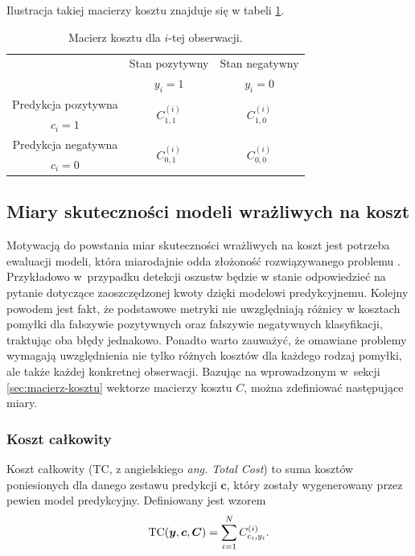 \documentclass[inzynierska]{pwr_wmat_praca_dyplomowa}
\theoremstyle{plain}
\numberwithin{theorem}{chapter}
\theoremstyle{definition}
\numberwithin{theorem}{chapter}
\begin{document}
Ilustracja takiej macierzy kosztu znajduje się w tabeli \ref{tab:macierz-kosztu}.
\begin{table}[h]
	\begin{center}
		\begin{tabular}{c|c|c}
			\multirow{2}{4em}{} & Stan pozytywny & Stan negatywny \\
			& $y_i = 1$            & $y_i = 0$ \\
			\hline
			Predykcja pozytywna & \multirow{2}{4em}{\centering $C^{(i)}_{1,1}$} & \multirow{2}{4em}{\centering $C^{(i)}_{1,0}$} \\
			$c_i = 1$         &                    &                    \\
			\hline
			Predykcja negatywna & \multirow{2}{4em}{\centering $C^{(i)}_{0,1}$} & \multirow{2}{4em}{\centering $C^{(i)}_{0,0}$} \\
			$c_i = 0$         &                    &                    \\
		\end{tabular}
	\end{center}
	\caption{Macierz kosztu dla $i$-tej obserwacji.}
	\label{tab:macierz-kosztu}
\end{table}

\subsection{Miary skuteczności modeli wrażliwych na koszt}
Motywacją do powstania miar skuteczności wrażliwych na koszt jest potrzeba ewaluacji modeli, która miarodajnie odda złożoność rozwiązywanego problemu \cite{EDCSLR}. Przykładowo w~przypadku detekcji oszustw będzie w stanie odpowiedzieć na pytanie dotyczące zaoszczędzonej kwoty dzięki modelowi predykcyjnemu. Kolejny powodem jest fakt, że podstawowe metryki nie uwzględniają różnicy w kosztach pomyłki dla fałszywie pozytywnych oraz fałszywie negatywnych klasyfikacji, traktując oba błędy jednakowo. Ponadto warto zauważyć, że omawiane problemy wymagają uwzględnienia nie tylko różnych kosztów dla każdego rodzaj pomyłki, ale także każdej konkretnej obserwacji. Bazując na wprowadzonym w~sekcji \ref{sec:macierz-kosztu} wektorze macierzy kosztu $C$, można zdefiniować następujące miary.

\subsubsection{Koszt całkowity}
Koszt całkowity (TC, z angielskiego \textit{ang. Total Cost}) to suma kosztów poniesionych dla danego zestawu predykcji $\boldsymbol{c}$, który zostały wygenerowany przez pewien model predykcyjny. Definiowany jest wzorem
\begin{equation}
	\label{koszt-calkowity}
	\text{TC}(\boldsymbol{y}, \boldsymbol{c}, \boldsymbol{C}) = \sum_{i=1}^N C^{(i)}_{c_i,y_i} \text{.}
\end{equation} 
\end{document}
